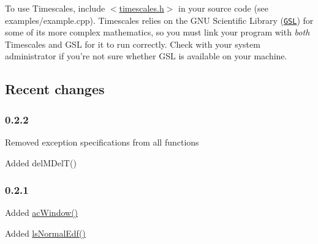 To use Timescales, include {\ttfamily $<$\hyperlink{timescales_8h}{timescales.h}$>$} in your source code (see examples/example.cpp). Timescales relies on the GNU Scientific Library (\href{http://www.gnu.org/software/gsl/}{\tt GSL}) for some of its more complex mathematics, so you must link your program with {\itshape both\/} Timescales and GSL for it to run correctly. Check with your system administrator if you're not sure whether GSL is available on your machine.\hypertarget{index_changelog}{}\subsection{Recent changes}\label{index_changelog}
\hypertarget{index_v022}{}\subsubsection{0.2.2}\label{index_v022}
\begin{DoxyItemize}
\item Removed exception specifications from all functions \item Added delMDelT()\end{DoxyItemize}
\hypertarget{index_v021}{}\subsubsection{0.2.1}\label{index_v021}
\begin{DoxyItemize}
\item Added \hyperlink{group__acf_ga3abd7e8a3ae34d649c1fb03512ad93f2}{acWindow()} \item Added \hyperlink{group__period_gab3a488d98ed28a6723689f09b5d984fb}{lsNormalEdf()} \end{DoxyItemize}
